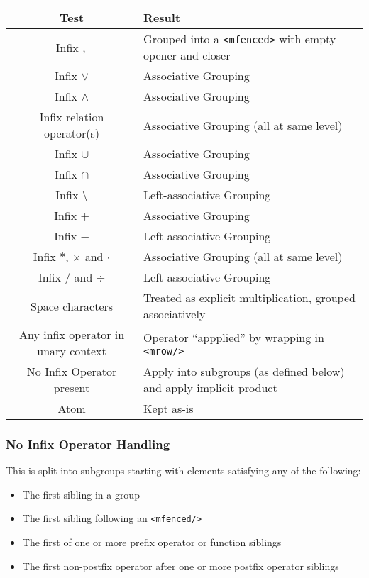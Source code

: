 \begin{tabular}{|c|l|}
\hline
Test & Result \\
\hline
Infix $,$ & Grouped into a \verb|<mfenced>| with empty opener and closer \\
Infix $\vee$ & Associative Grouping \\
Infix $\wedge$ & Associative Grouping \\
Infix relation operator(s) & Associative Grouping (all at same level) \\
Infix $\cup$ & Associative Grouping \\
Infix $\cap$ & Associative Grouping \\
Infix $\setminus$ & Left-associative Grouping \\
Infix $+$ & Associative Grouping \\
Infix $-$ & Left-associative Grouping \\
Infix $*$, $\times$ and $\cdot$ & Associative Grouping (all at same level) \\
Infix $/$ and $\div$ & Left-associative Grouping \\
Space characters & Treated as explicit multiplication, grouped associatively \\
Any infix operator in unary context & Operator ``appplied'' by wrapping in \verb|<mrow/>| \\
No Infix Operator present & Apply into subgroups (as defined below) and apply implicit product \\
Atom & Kept as-is \\
\hline
\end{tabular}

\subsubsection*{No Infix Operator Handling}

This is split into subgroups starting with elements satisfying
any of the following:

\begin{itemize}
\item The first sibling in a group
\item The first sibling following an \verb|<mfenced/>|
\item The first of one or more prefix operator or function siblings
\item The first non-postfix operator after one or more postfix operator siblings
\end{itemize}

